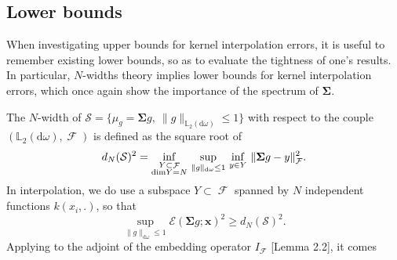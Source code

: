 \documentclass[twoside,11pt]{book}
\numberwithin{theorem}{chapter}
\numberwithin{definition}{chapter}
\numberwithin{proposition}{chapter}
\numberwithin{corollary}{chapter}
\numberwithin{example}{chapter}
\numberwithin{lemma}{chapter}
\numberwithin{assumption}{chapter}
\numberwithin{equation}{chapter}
\numberwithin{figure}{chapter}
\DeclareMathOperator{\F}{\mathcal{F}}
\def\Ltwo{\mathbb{L}_{2}(\mathrm{d} \omega)}
\newcommand{\rb}[1]{\textcolor{magenta}{#1}}
\begin{document}
\subsection{Lower bounds}\label{CVS_sec:lower_bounds}
When investigating upper bounds for kernel interpolation errors, it is useful to remember existing lower bounds, so as to evaluate the tightness of one's results. In particular, $N$-widths theory \citep{Pin12} implies lower bounds for kernel interpolation errors, which once again show the importance of the spectrum of $\bm{\Sigma}$.

 The $N$-width of $\mathcal{S} = \{ \mu_{g} = \bm{\bm{\Sigma}}g, \: \|g\|_{\Ltwo} \leq 1\}$ with respect to the couple $(\Ltwo, \F)$ \citep[Chapter 1.7]{Pin12} is defined as the square root of
\begin{equation}
	d_{N}(\mathcal{S})^{2}  = \inf\limits_{\substack{Y \subset \F\\ \mathrm{dim}Y = N}}\, \sup\limits_{\|g\|_{\mathrm{d}\omega} \leq 1}\, \inf\limits_{y \in Y}\, \|\bm{\Sigma} g -y \|_{\F}^{2}. \nonumber \\
\end{equation}
In interpolation, we do use a subspace $Y \subset \F$ spanned by $N$ independent functions $k(x_{i},.)$, so that
\begin{equation}
\sup\limits_{\|g\|_{\mathrm{d}\omega} \leq 1} \mathcal{E}(\bm{\Sigma} g;\bm{x})^{2} \geq d_{N}(\mathcal{S})^{2}.
\end{equation}
Applying \citep[Theorem 2.2, Chapter 4]{Pin12} to the adjoint of the embedding operator $I_{\F}$ \cite{StSc12}[Lemma 2.2], it comes
%
\end{document}
